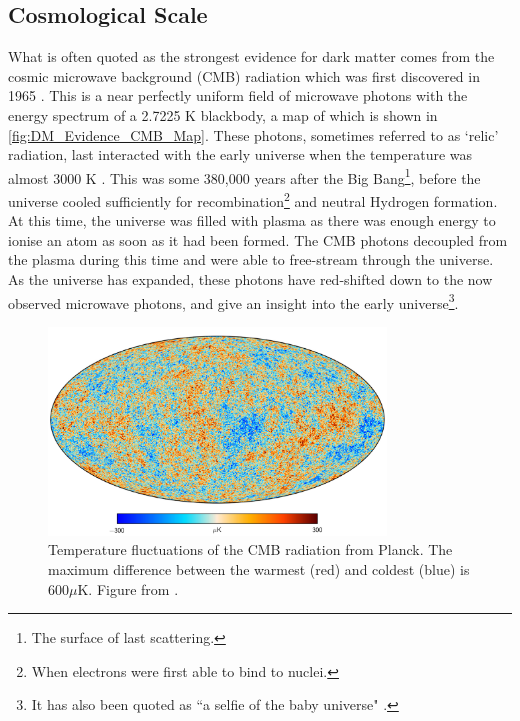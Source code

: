 \subsection{Cosmological Scale}

\par
What is often quoted as the strongest evidence for dark matter comes from the cosmic microwave background (CMB) radiation which was first discovered in 1965 \cite{cmb_origins_ref}.
This is a near perfectly uniform field of microwave photons with the energy spectrum of a 2.7225 K blackbody, a map of which is shown in \autoref{fig:DM_Evidence_CMB_Map}.
These photons, sometimes referred to as `relic' radiation, last interacted with the early universe when the temperature was almost 3000 K \cite{bigbang_nucleosynthesis_ref}.
This was some 380,000 years after the Big Bang\footnote{The surface of last scattering.}, before the universe cooled sufficiently for recombination\footnote{When electrons were first able to bind to nuclei.} and neutral Hydrogen formation.
At this time, the universe was filled with plasma as there was enough energy to ionise an atom as soon as it had been formed.
The CMB photons decoupled from the plasma during this time and were able to free-stream through the universe.
As the universe has expanded, these photons have red-shifted down to the now observed microwave photons, and give an insight into the early universe\footnote{It has also been quoted as ``a selfie of the baby universe" \cite{marisarthurs_thesis_ref}.}.

\begin{figure}[]%
    \centering
    \includegraphics[width=0.8\textwidth]{Figures/DarkMatterEvidence/cmb_radiation.png}
    \caption[Temperature fluctuations of the CMB radiation]{Temperature fluctuations of the CMB radiation from Planck.
             The maximum difference between the warmest (red) and coldest (blue) is 600$\mu$K.
             Figure from \cite{plank_result_ref}.}
    \label{fig:DM_Evidence_CMB_Map}
\end{figure}

